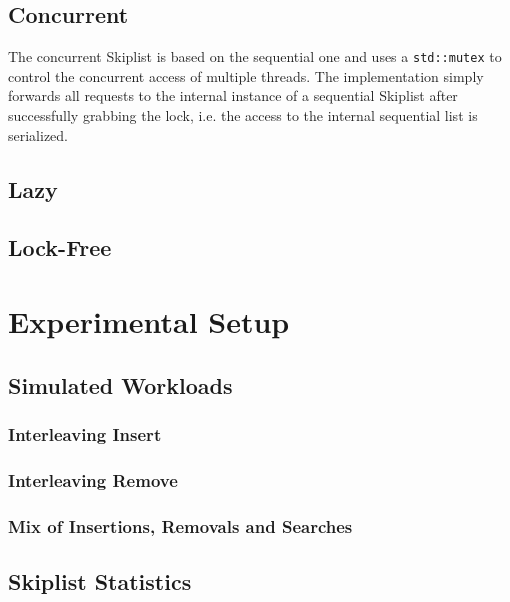 \subsection{Concurrent}
The concurrent Skiplist is based on the sequential one and uses a \texttt{std::mutex} to control the concurrent access of multiple threads. The implementation simply forwards all requests to the internal instance of a sequential Skiplist after successfully grabbing the lock, i.e. the access to the internal sequential list is serialized.

\subsection{Lazy}

\subsection{Lock-Free}



\section{Experimental Setup}

\subsection{Simulated Workloads}

\subsubsection{Interleaving Insert}

\subsubsection{Interleaving Remove}

\subsubsection{Mix of Insertions, Removals and Searches}


\subsection{Skiplist Statistics}

